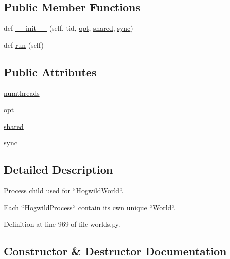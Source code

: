 \subsection*{Public Member Functions}
\begin{DoxyCompactItemize}
\item 
def \hyperlink{classparlai_1_1core_1_1worlds_1_1HogwildProcess_a8356a8de17d41e86e4da0262fc5d36d7}{\+\_\+\+\_\+init\+\_\+\+\_\+} (self, tid, \hyperlink{classparlai_1_1core_1_1worlds_1_1HogwildProcess_a640d8da3bcea07a0748b8973f390f125}{opt}, \hyperlink{classparlai_1_1core_1_1worlds_1_1HogwildProcess_a614b61613d85c80764b8b68697697e13}{shared}, \hyperlink{classparlai_1_1core_1_1worlds_1_1HogwildProcess_a7bf5f7806e93a6b1ecb02fd12fa4a01f}{sync})
\item 
def \hyperlink{classparlai_1_1core_1_1worlds_1_1HogwildProcess_a749caf3085cb7b373db66b6f92567290}{run} (self)
\end{DoxyCompactItemize}
\subsection*{Public Attributes}
\begin{DoxyCompactItemize}
\item 
\hyperlink{classparlai_1_1core_1_1worlds_1_1HogwildProcess_a4266e7c47686cd9b4fa9d62ae84375c8}{numthreads}
\item 
\hyperlink{classparlai_1_1core_1_1worlds_1_1HogwildProcess_a640d8da3bcea07a0748b8973f390f125}{opt}
\item 
\hyperlink{classparlai_1_1core_1_1worlds_1_1HogwildProcess_a614b61613d85c80764b8b68697697e13}{shared}
\item 
\hyperlink{classparlai_1_1core_1_1worlds_1_1HogwildProcess_a7bf5f7806e93a6b1ecb02fd12fa4a01f}{sync}
\end{DoxyCompactItemize}


\subsection{Detailed Description}
\begin{DoxyVerb}Process child used for ``HogwildWorld``.

Each ``HogwildProcess`` contain its own unique ``World``.
\end{DoxyVerb}
 

Definition at line 969 of file worlds.\+py.



\subsection{Constructor \& Destructor Documentation}
\mbox{\label{classparlai_1_1core_1_1worlds_1_1HogwildProcess_a8356a8de17d41e86e4da0262fc5d36d7}} 
